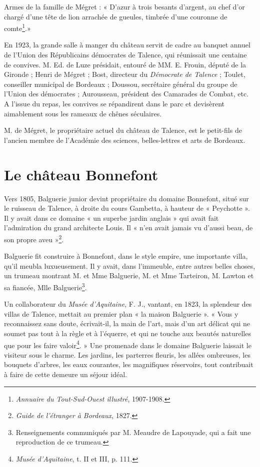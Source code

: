 Armes de la famille de Mégret : « D'azur à trois besants d'argent, au chef d'or chargé d'une tête de lion arrachée de gueules, timbrée d'une couronne de comte\footnote{\textit{Annuaire du Tout-Sud-Ouest illustré}, 1907-1908.}.»

En 1923, la grande salle à manger du château servit de cadre au banquet annuel de l'Union des Républicains démocrates de Talence, qui réunissait une centaine de convives. M. Ed. de Luze présidait, entouré de MM. E. Frouin, député de la Gironde ; Henri de Mégret ; Bost, directeur du \textit{Démocrate de Talence} ; Toulet, conseiller municipal de Bordeaux ; Doussou, secrétaire général du groupe de l'Union des démocrates ; Aurousseau, président des Camarades de Combat, etc. A l'issue du repas, les convives se répandirent dans le parc et devisèrent aimablement sous les rameaux de chênes séculaires.

M. de Mégret, le propriétaire actuel du château de Talence, est le petit-fils de l'ancien membre de l'Académie des sciences, belles-lettres et arts de Bordeaux. 

\section{Le château Bonnefont}

Vers 1805, Balguerie junior devint propriétaire du domaine Bonnefont, situé sur le ruisseau de Talence, à droite du cours Gambetta, à hauteur de « Peychotte ». Il y avait dans ce domaine « un superbe jardin anglais » qui avait fait l'admiration du grand architecte Louis. Il « n'en avait jamais vu d'aussi beau, de son propre aveu »\footnote{\textit{Guide de l'étranger à Bordeaux}, 1827.}. 

Balguerie fit construire à Bonnefont, dans le style empire, une importante villa, qu'il meubla luxueusement. Il y avait, dans l'immeuble, entre autres belles choses, un trumeau montrant M. et Mme Balguerie, M. et Mme Tarteiron, M. Lawton et sa fiancée, Mlle Balguerie\footnote{Renseignements communiqués par M. Meaudre de Lapouyade, qui a fait une reproduction de ce trumeau.}.

Un collaborateur du \textit{Musée d'Aquitaine}, F. J., vantant, en 1823, la splendeur des villas de Talence, mettait au premier plan « la maison Balguerie ». « Vous y reconnaissez sans doute, écrivait-il, la main de l'art, mais d'un art délicat qui ne soumet pas tout à la règle et à l'équerre, et qui ne touche aux beautés naturelles que pour les faire valoir\footnote{\textit{Musée d'Aquitaine}, t. II et III, p. 111.}. » Une promenade dans le domaine Balguerie laissait le visiteur sous le charme. Les jardins, les parterres fleuris, les allées ombreuses, les bouquets d'arbres, les eaux courantes, les magnifiques réservoirs, tout contribuait à faire de cette demeure un séjour idéal.

